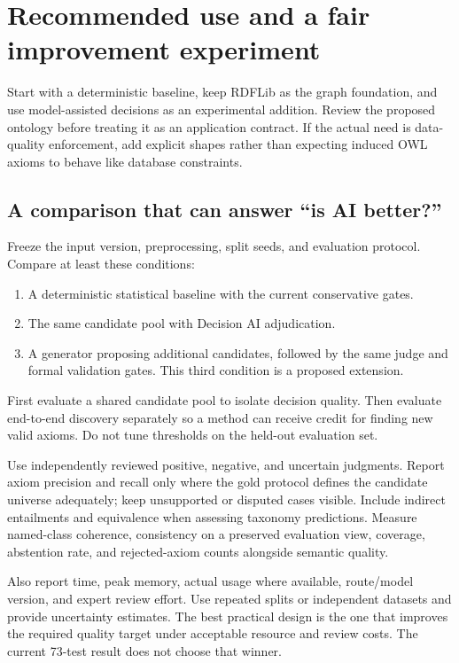 \documentclass[11pt,a4paper]{article}
\begin{document}
\section{Recommended use and a fair improvement experiment}\label{sec:recommendation}

Start with a deterministic baseline, keep RDFLib as the graph foundation, and
use model-assisted decisions as an experimental addition. Review the proposed
ontology before treating it as an application contract. If the actual need is
data-quality enforcement, add explicit shapes rather than expecting induced OWL
axioms to behave like database constraints.

\subsection{A comparison that can answer ``is AI better?''}\label{sec:experiment}
Freeze the input version, preprocessing, split seeds, and evaluation protocol.
Compare at least these conditions:
\begin{enumerate}
\item A deterministic statistical baseline with the current conservative gates.
\item The same candidate pool with Decision AI adjudication.
\item A generator proposing additional candidates, followed by the same judge
and formal validation gates. This third condition is a proposed extension.
\end{enumerate}
First evaluate a shared candidate pool to isolate decision quality. Then evaluate
end-to-end discovery separately so a method can receive credit for finding new
valid axioms. Do not tune thresholds on the held-out evaluation set.

Use independently reviewed positive, negative, and uncertain judgments. Report
axiom precision and recall only where the gold protocol defines the candidate
universe adequately; keep unsupported or disputed cases visible. Include
indirect entailments and equivalence when assessing taxonomy predictions.
Measure named-class coherence, consistency on a preserved evaluation view,
coverage, abstention rate, and rejected-axiom counts alongside semantic quality.

Also report time, peak memory, actual usage where available, route/model version,
and expert review effort. Use repeated splits or independent datasets and provide
uncertainty estimates. The best practical design is the one that improves the
required quality target under acceptable resource and review costs. The current
73-test result does not choose that winner.
\end{document}
